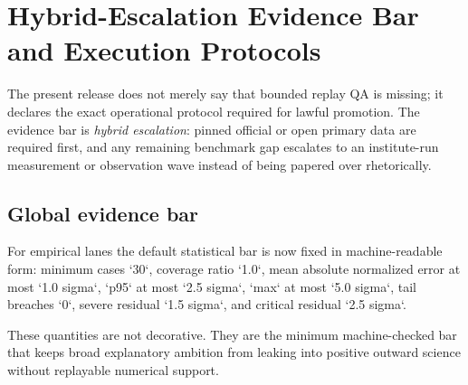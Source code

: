 \section{Hybrid-Escalation Evidence Bar and Execution Protocols}
\label{sec:oc-core-1-3-empirical-execution-protocols}

The present release does not merely say that bounded replay QA is missing; it declares the exact operational protocol required for lawful promotion.
The evidence bar is \emph{hybrid escalation}: pinned official or open primary data are required first, and any remaining benchmark gap escalates to an institute-run measurement or observation wave instead of being papered over rhetorically.

\subsection{Global evidence bar}
For empirical lanes the default statistical bar is now fixed in machine-readable form: minimum cases `30`, coverage ratio `1.0`, mean absolute normalized error at most `1.0 sigma`, `p95` at most `2.5 sigma`, `max` at most `5.0 sigma`, tail breaches `0`, severe residual `1.5 sigma`, and critical residual `2.5 sigma`.

These quantities are not decorative. They are the minimum machine-checked bar that keeps broad explanatory ambition from leaking into positive outward science without replayable numerical support.

